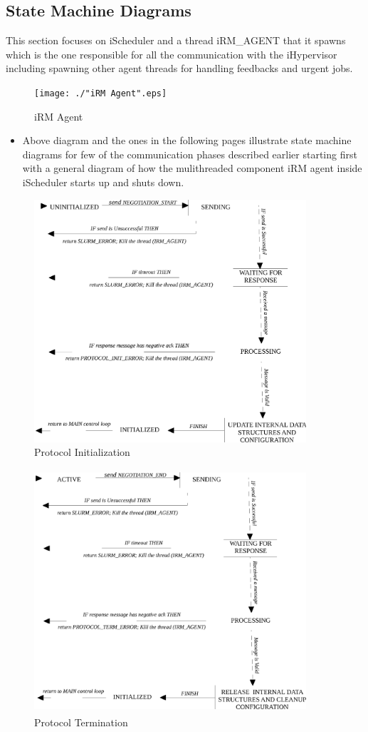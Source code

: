 \documentclass[a4paper, 12pt]{article}
\begin{document}
\subsection{State Machine Diagrams}
This section focuses on iScheduler and a thread iRM\_AGENT that it spawns which is the one responsible for all the communication with the iHypervisor including spawning other agent threads for handling feedbacks and urgent jobs.
\vspace{10mm}
\begin{figure}[h]
\centering
\texttt{[image: ./"iRM Agent".eps]}
\caption{iRM Agent}
\label{fig:Init}
\end{figure}
\begin{itemize}
\item Above diagram and the ones in the following pages illustrate state machine diagrams for few of the communication phases described earlier starting first with a general diagram of how the mulithreaded component iRM agent inside iScheduler starts up and shuts down.
\end{itemize}
\vspace{-20mm}
\begin{figure}[h]
\centering
\includegraphics[width=0.9\textwidth, height=90mm]{./Init.eps}
\caption{Protocol Initialization}
\label{fig:Init}
\end{figure}
\vspace{5mm}
\begin{figure}[h]
\centering
\includegraphics[width=0.9\textwidth, height=90mm]{./Term.eps}
\caption{Protocol Termination}
\label{fig:Term}
\end{figure}
\end{document}
